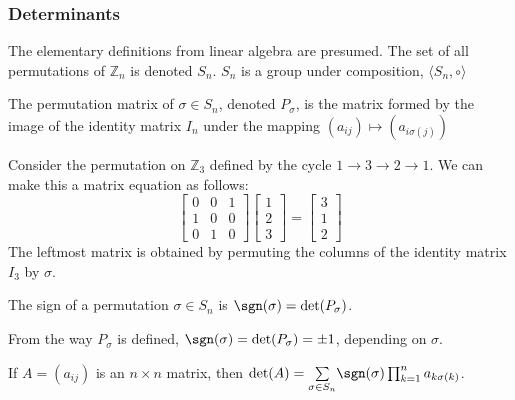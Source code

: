             \subsubsection{Determinants}
                The elementary definitions from linear algebra
                are presumed. The set of all permutations of
                $\mathbb{Z}_{n}$ is denoted $S_n$. $S_{n}$ is a
                group under composition,
                $\langle S_{n},\circ\rangle$
                \begin{definition}
                    The permutation matrix of $\sigma \in S_{n}$,
                    denoted $P_{\sigma}$, is the matrix formed
                    by the image of the identity matrix $I_{n}$
                    under the mapping
                    $(a_{ij})\mapsto (a_{i\sigma(j)})$
                \end{definition}
                \begin{example}
                    Consider the permutation on $\mathbb{Z}_3$
                    defined by the cycle
                    $1\rightarrow 3\rightarrow 2\rightarrow 1$.
                    We can make this a matrix equation as follows:
                    \begin{equation*}
                        \begin{bmatrix}
                            0&0&1\\
                            1&0&0\\
                            0&1&0
                        \end{bmatrix}
                        \begin{bmatrix}
                            1\\
                            2\\
                            3
                        \end{bmatrix}
                        =
                        \begin{bmatrix}
                            3\\
                            1\\
                            2
                        \end{bmatrix}    
                    \end{equation*}
                    The leftmost matrix is obtained by
                    permuting the columns of the identity
                    matrix $I_{3}$ by $\sigma$.
                \end{example}
                \begin{definition}
                    The sign of a permutation $\sigma\in S_{n}$
                    is $\sgn(\sigma) = \det(P_{\sigma})$.
                \end{definition}
                From the way $P_{\sigma}$ is defined,
                $\sgn(\sigma)=\det(P_{\sigma})=\pm 1$,
                depending on $\sigma$.
                \begin{theorem}
                    If $A=(a_{ij})$ is an $n\times n$ matrix, then
                    $\det(A)=\underset{\sigma\in S_n}%
                     \sum\sgn(\sigma)\prod_{k=1}^{n}a_{k\sigma(k)}$.
                \end{theorem}
